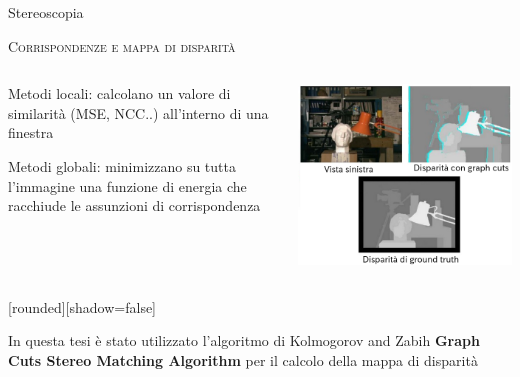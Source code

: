 \documentclass{beamer}
\begin{document}
\begin{section}{Stereoscopia}
\begin{frame}[t]{\textsc{Corrispondenze e mappa di disparit\`{a}}}
\begin{columns}
\begin{column}{5cm}
\vspace{1em}
\begin{itemize}
\item \small{Metodi locali: calcolano un valore di similarit\`{a} (MSE, NCC..) all'interno di una finestra  
\item Metodi globali: minimizzano su tutta l'immagine una funzione di energia che racchiude le assunzioni di corrispondenza
}
\end{itemize}
\end{column}
\begin{column}{5cm}
\vspace{1.5em}
\centering
\includegraphics[width=1\linewidth]{./img/gc.png}
\end{column}
\end{columns}
\vspace{-1em}
\begin{center}
	[rounded][shadow=false]
\begin{block}{}
\center \small{In questa tesi \`{e} stato utilizzato l'algoritmo di Kolmogorov and Zabih \textbf{Graph Cuts Stereo Matching Algorithm} per il calcolo della mappa di disparit\`{a}}
\end{block}
\end{center}
\end{frame}


\end{section}
\end{document}
